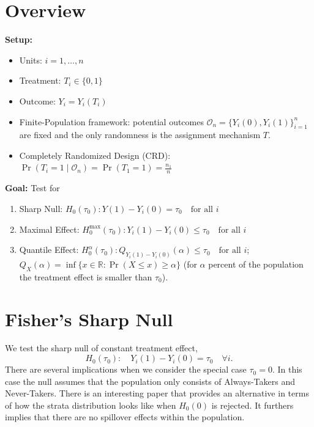\documentclass[11pt]{exam}
\theoremstyle{plain}
\newcommand{\R}{\mathbb{R}}
\begin{document}

\begingroup\small
\section{Overview}

\textbf{Setup:}
\begin{itemize}
      \item Units: $i = 1,\ldots,n$
      \item Treatment: $T_i \in \{0,1\}$
      \item Outcome: $Y_i = Y_i(T_i)$
      \item Finite-Population framework: potential outcomes $\mathcal{O}_n=\{Y_i(0),Y_i(1)\}_{i=1}^n$ are fixed and the only randomness is the assignment mechanism $T$.
      \item Completely Randomized Design (CRD): $\Pr(T_i=1\mid \mathcal{O}_n)=\Pr(T_1=1)=\tfrac{n_1}{n}$ 
\end{itemize}

\noindent
\textbf{Goal:} Test for 
\begin{enumerate}
    \item Sharp Null: $H_0(\tau_0): Y(1) - Y_i(0) = \tau_0 \quad \text{for all } i$
    \item Maximal Effect: $H^{\text{max}}_0(\tau_0): Y_i(1) - Y_i(0) \leq \tau_0 \quad \text{for all } i$
    \item Quantile Effect: $H^\alpha_0(\tau_0): Q_{Y_i(1) - Y_i(0)}(\alpha) \leq \tau_0 \quad \text{for all } i$; $Q_X(\alpha) = \inf\{x \in \R: \Pr(X \leq x) \geq \alpha\}$ (for $\alpha$ percent of the population the treatment effect is smaller than $\tau_0$).
\end{enumerate}




\section{Fisher's Sharp Null}
We test the sharp null of constant treatment effect,
\[
H_0(\tau_0):\quad Y_i(1)-Y_i(0)=\tau_0\quad\forall i.
\]
There are several implications when we consider the special case $\tau_0 = 0$. In this case the null assumes that the population only consists of Always-Takers and Never-Takers. There is an interesting paper \citep{christy2025countingdefiersdesignbasedmodel} that provides an alternative in terms of how the strata distribution looks like when $H_0(0)$ is rejected. It furthers implies that there are no spillover effects within the population. 
\end{document}
